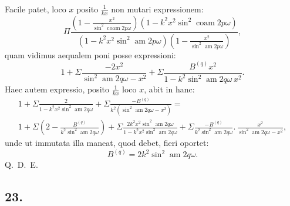 \documentclass{article}
\begin{document}
Facile patet, loco $x$ posito $\frac{1}{kx}$ non mutari expressionem:
\[
\Pi\frac{\left(1-\frac{x^{2}}{\sin^{2}\operatorname{coam}2p\omega}\right)\left(1-k^{2}x^{2}\sin^{2}\operatorname{coam}2p\omega\right)}{\left(1-k^{2}x^{2}\sin^{2}\operatorname{am}2p\omega\right)\left(1-\frac{x^{2}}{\sin^{2}\operatorname{am}2p\omega}\right)},
\]
quam vidimus aequalem poni posse expressioni:
\[
1+\Sigma\frac{-2x^{2}}{\sin^{2}\operatorname{am}2q\omega-x^{2}}+\Sigma\frac{B^{(q)}x^{2}}{1-k^{2}\sin^{2}\operatorname{am}2q\omega\,x^{2}}.
\]
Haec autem expressio, posito $\frac{1}{kx}$ loco $x$, abit in hanc:
\[
\begin{gathered}
1+\Sigma\frac{2}{1-k^{2}x^{2}\sin^{2}\operatorname{am}2q\omega}+\Sigma\frac{-B^{(q)}}{k^{2}\left(\sin^{2}\operatorname{am}2q\omega-x^{2}\right)}=\\[1.5ex]
1+\Sigma\left(2-\frac{B^{(q)}}{k^{2}\sin^{2}\operatorname{am}2q\omega}\right)+\Sigma\frac{2k^{2}x^{2}\sin^{2}\operatorname{am}2q\omega}{1-k^{2}x^{2}\sin^{2}\operatorname{am}2q\omega}+\Sigma\frac{-B^{(q)}}{k^{2}\sin^{2}\operatorname{am}2q\omega}.\,\frac{x^{2}}{\sin^{2}\operatorname{am}2q\omega-x^{2}},
\end{gathered}
\]
unde ut immutata illa maneat, quod debet, fieri oportet:
\[
B^{(q)}=2k^{2}\sin^{2}\operatorname{am}2q\omega.
\]
Q.\ D.\ E.

\subsection*{23.}
\end{document}
